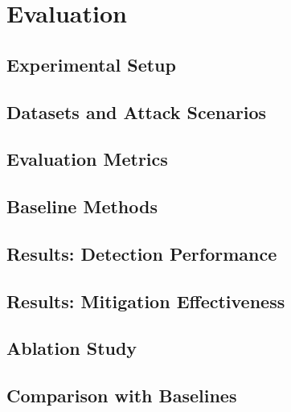 \chapter{Evaluation}
\label{ch:evaluation}


\section{Experimental Setup}
\section{Datasets and Attack Scenarios}
\section{Evaluation Metrics}
\section{Baseline Methods}
\section{Results: Detection Performance}
\section{Results: Mitigation Effectiveness}
\section{Ablation Study}
\section{Comparison with Baselines}
